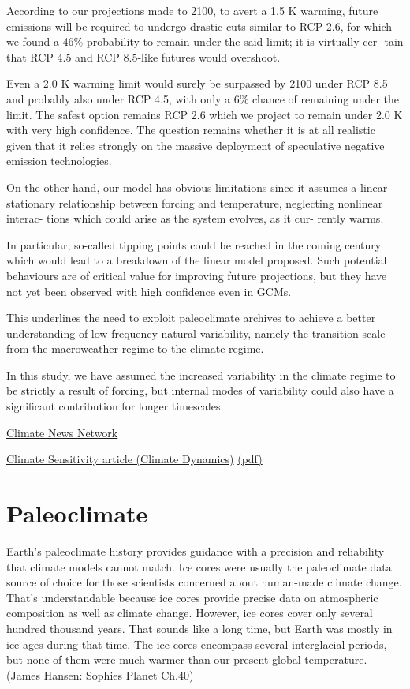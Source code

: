 \documentclass[
]{book}
\begin{document}
According to our projections made to 2100, to avert a 1.5
K warming, future emissions will be required to undergo
drastic cuts similar to RCP 2.6, for which we found a 46\%
probability to remain under the said limit; it is virtually cer-
tain that RCP 4.5 and RCP 8.5-like futures would overshoot.

Even a 2.0 K warming limit would surely be surpassed by
2100 under RCP 8.5 and probably also under RCP 4.5, with
only a 6\% chance of remaining under the limit. The safest
option remains RCP 2.6 which we project to remain under
2.0 K with very high confidence. The question remains
whether it is at all realistic given that it relies strongly on
the massive deployment of speculative negative emission
technologies.

On the other hand, our model has obvious limitations
since it assumes a linear stationary relationship between
forcing and temperature, neglecting nonlinear interac-
tions which could arise as the system evolves, as it cur-
rently warms.

In particular, so-called tipping points could
be reached in the coming century which would lead to a
breakdown of the linear model proposed. Such potential
behaviours are of critical value for improving future projections,
but they have not yet been observed with high confidence even in GCMs.

This underlines the need to exploit
paleoclimate archives to achieve a better understanding of
low-frequency natural variability, namely the transition scale
from the macroweather regime to the climate regime.

In this study, we have assumed the increased variability in the climate regime
to be strictly a result of forcing,
but internal modes of variability could also have a significant contribution
for longer timescales.

\href{https://climatenewsnetwork.net/seven-years-to-ground-zero-for-the-climate-crisis/}{Climate News Network}

\href{https://link.springer.com/article/10.1007/s00382-020-05521-x}{Climate Sensitivity article (Climate Dynamics)}
\href{pdf/Hebert_2020_Climate_Sensitivity_Estimates.pdf}{(pdf)}

\hypertarget{paleoclimate}{%
\chapter{Paleoclimate}\label{paleoclimate}}

Earth's paleoclimate history provides guidance with a precision and reliability that climate
models cannot match. Ice cores were usually the paleoclimate data source of choice for those
scientists concerned about human-made climate change. That's understandable because ice
cores provide precise data on atmospheric composition as well as climate change.
However, ice cores cover only several hundred thousand years. That sounds like a long time, but
Earth was mostly in ice ages during that time. The ice cores encompass several interglacial
periods, but none of them were much warmer than our present global temperature.
(James Hansen: Sophies Planet Ch.40)
\end{document}

